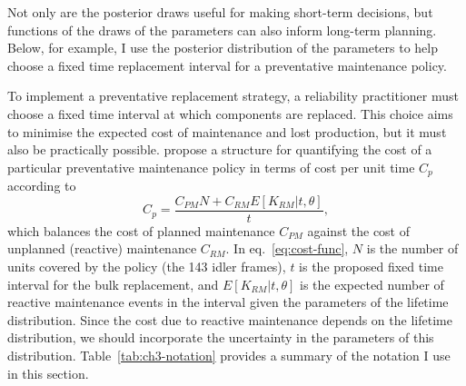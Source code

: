 Not only are the posterior draws useful for making short-term decisions, but functions of the draws of the parameters can also inform long-term planning. Below, for example, I use the posterior distribution of the parameters to help choose a fixed time replacement interval for a preventative maintenance policy.

To implement a preventative replacement strategy, a reliability practitioner must choose a fixed time interval at which components are replaced. This choice aims to minimise the expected cost of maintenance and lost production, but it must also be practically possible. \citet{jardine2013} propose a structure for quantifying the cost of a particular preventative maintenance policy in terms of cost per unit time $C_p$ according to
\begin{equation}
  \label{eq:cost-func}
 C_p = \frac{C_{PM} N + C_{RM} E[K_{RM}|t,\theta]}{t},
\end{equation}
which balances the cost of planned maintenance $C_{PM}$ against the cost of unplanned (reactive) maintenance $C_{RM}$. In eq.~\eqref{eq:cost-func}, $N$ is the number of units covered by the policy (the 143 idler frames), $t$ is the proposed fixed time interval for the bulk replacement, and $E[K_{RM}|t,\theta]$ is the expected number of reactive maintenance events in the interval given the parameters of the lifetime distribution. Since the cost due to reactive maintenance depends on the lifetime distribution, we should incorporate the uncertainty in the parameters of this distribution. Table~\ref{tab:ch3-notation} provides a summary of the notation I use in this section.

